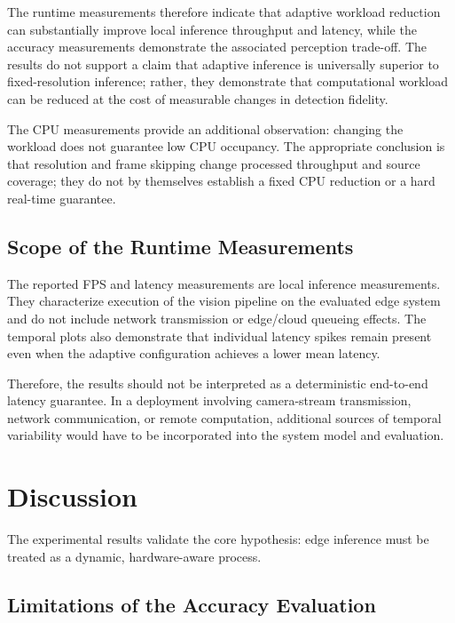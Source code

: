 \documentclass{ieeeaccess}
\begin{document}
The runtime measurements therefore indicate that adaptive workload
reduction can substantially improve local inference throughput and latency,
while the accuracy measurements demonstrate the associated perception
trade-off. The results do not support a claim that adaptive inference is
universally superior to fixed-resolution inference; rather, they demonstrate
that computational workload can be reduced at the cost of measurable changes
in detection fidelity.

\begin{highlight}
The CPU measurements provide an additional observation: changing the
workload does not guarantee low CPU occupancy. The appropriate conclusion is
that resolution and frame skipping change processed throughput and source
coverage; they do not by themselves establish a fixed CPU reduction or a
hard real-time guarantee.
\end{highlight}


\subsection{Scope of the Runtime Measurements}

The reported FPS and latency measurements are local inference measurements.
They characterize execution of the vision pipeline on the evaluated edge
system and do not include network transmission or edge/cloud queueing
effects. The temporal plots also demonstrate that individual latency spikes
remain present even when the adaptive configuration achieves a lower mean
latency.

Therefore, the results should not be interpreted as a deterministic
end-to-end latency guarantee. In a deployment involving camera-stream
transmission, network communication, or remote computation, additional
sources of temporal variability would have to be incorporated into the
system model and evaluation.

\section{Discussion}
\label{sec:discussion}
The experimental results validate the core hypothesis: edge inference must be treated as a dynamic, hardware-aware process. 

\subsection{Limitations of the Accuracy Evaluation}
\end{document}
